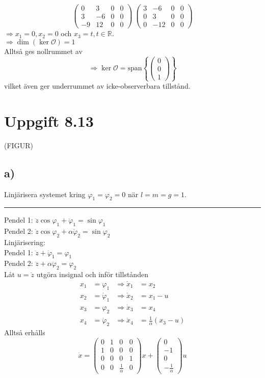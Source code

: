 \documentclass[12pt]{article}
\newcommand{\sspan}[1]{\mathrm{span}\left\{#1\right\}}
\newcommand{\qline}{\hrule \vspace*{10pt}}
\begin{document}
\begin{equation*}
  \left(
  \begin{array}{ccc|c}
    0 & 3 & 0 & 0\\
    3 & -6 & 0 & 0 \\
    -9 & 12 & 0 & 0
  \end{array}\right) ~ 
\left(
  \begin{array}{ccc|c}
    3 & -6 & 0 & 0 \\
    0 & 3 & 0 & 0 \\
    0 & -12 & 0 & 0
  \end{array}
\right)
\end{equation*}
$\Rightarrow x_1 = 0, x_2 = 0$ och $x_3 = t, t \in \mathbb{R}$. \\
$\Rightarrow \dim{(\ker{\mathcal{O}})} = 1$ \\
Alltså ges nollrummet av
\[\Rightarrow \ker{\mathcal{O}} = \sspan{
  \begin{pmatrix}
    0 \\
    0 \\
    1
  \end{pmatrix}
}\]
vilket även ger underrummet av icke-observerbara tillstånd.

\section*{Uppgift 8.13}
(FIGUR)
\subsection*{a)}
Linjärisera systemet kring $\varphi_1 = \varphi_2 = 0$ när $l = m = g = 1$.
\qline
Pendel 1: $\ddot{z}\cos{\varphi_1} + \ddot{\varphi}_1 = \sin{\varphi_1}$ \\
Pendel 2: $\ddot{z}\cos{\varphi_2} + \alpha\ddot{\varphi}_2 = \sin{\varphi_2}$ \\
Linjärisering: \\
Pendel 1: $\ddot{z} + \ddot{\varphi}_1 = \varphi_1$ \\
Pendel 2: $\ddot{z} + \alpha\ddot{\varphi}_2 = \varphi_2$ \\
Låt $u = \ddot{z}$ utgöra insignal och inför tillstånden
\begin{align*}
x_1 &= \varphi_1 &\Rightarrow \dot{x}_1 &= x_2 \\
x_2 &= \dot{\varphi}_1 &\Rightarrow \dot{x}_2 &= x_1 - u\\
x_3 &= \varphi_2 &\Rightarrow \dot{x}_3 &= x_4\\
x_4 &= \dot{\varphi}_2 &\Rightarrow \dot{x}_4 &= \frac{1}{\alpha}(x_3 - u)
\end{align*}
Alltså erhålls
\[\dot{x} = \begin{pmatrix}
0 & 1 & 0 & 0 \\
1 & 0 & 0 & 0 \\
0 & 0 & 0 & 1 \\
0 & 0 & \frac{1}{\alpha} & 0
\end{pmatrix}x + \begin{pmatrix}
0 \\
-1 \\
0 \\
-\frac{1}{\alpha}
\end{pmatrix}u \]
\end{document}
